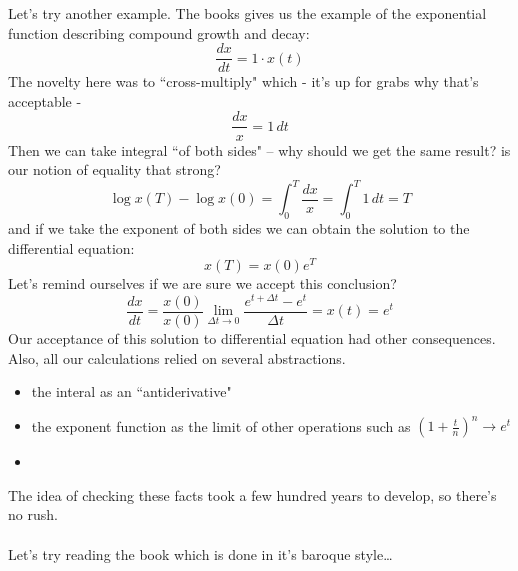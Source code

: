 \documentclass[12pt]{article}
\begin{document}
{\noindent Let's try another example.  The books gives us the example of the exponential function describing compound growth and decay:
$$ \frac{dx}{dt} = 1 \cdot x(t)  $$
The novelty here was to ``cross-multiply" which - it's up for grabs why that's acceptable - 
$$ \frac{dx}{x} = 1 \, dt $$
Then we can take integral ``of both sides" -- why should we get the same result?  is our notion of equality that strong?
$$ \log x(T) - \log x(0) =  \int_0^T \frac{ dx}{x} = \int_0^T 1 \, dt = T$$
and if we take the exponent of both sides we can obtain the solution to the differential equation:
$$ x(T) = x(0) e^T $$
Let's remind ourselves if we are sure we accept this conclusion?
$$  \frac{dx}{dt} = \frac{x(0)}{x(0)}  \lim_{\Delta t \to 0} \frac{e^{t+\Delta t} - e^t}{\Delta t} = x(t) = e^t $$
Our acceptance of this solution to differential equation had other consequences.  Also, all our calculations relied on several abstractions.
\begin{itemize}
	\item the interal as an ``antiderivative"
	\item the exponent function as the limit of other operations such as $(1 + \frac{t}{n})^n \to e^t$
	\item 
\end{itemize}
The idea of checking these facts took a few hundred years to develop, so there's no rush. \\ \\
Let's try reading the book which is done in it's baroque style\dots

\newpage

}
\end{document}
